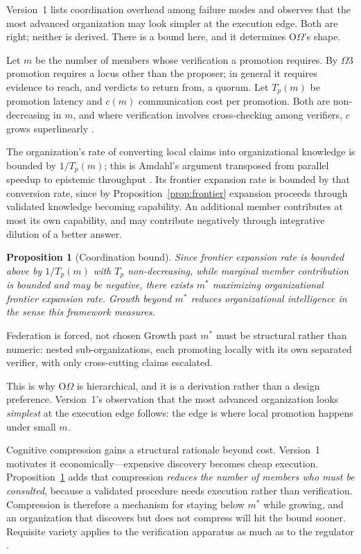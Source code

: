 \documentclass[11pt]{article}
\newtheorem{proposition}{Proposition}
\newcommand{\OOm}{\ensuremath{\mathrm{O}\Omega}}
\newcommand{\Tp}{\ensuremath{T_p}}
\begin{document}
Version~1 lists coordination overhead among failure modes and observes that the most advanced organization may look simpler at the execution edge. Both are right; neither is derived. There is a bound here, and it determines \OOm{}'s shape.

Let $m$ be the number of members whose verification a promotion requires. By $\Omega$3 promotion requires a locus other than the proposer; in general it requires evidence to reach, and verdicts to return from, a quorum. Let $\Tp(m)$ be promotion latency and $c(m)$ communication cost per promotion. Both are non-decreasing in $m$, and where verification involves cross-checking among verifiers, $c$ grows superlinearly \citep{brooks1975mythical}.

The organization's rate of converting local claims into organizational knowledge is bounded by $1/\Tp(m)$; this is Amdahl's argument transposed from parallel speedup to epistemic throughput \citep{amdahl1967validity}. Its frontier expansion rate is bounded by that conversion rate, since by Proposition~\ref{prop:frontier} expansion proceeds through validated knowledge becoming capability. An additional member contributes at most its own capability, and may contribute negatively through integrative dilution of a better answer.

\begin{proposition}[Coordination bound]\label{prop:coord}
Since frontier expansion rate is bounded above by $1/\Tp(m)$ with $\Tp$ non-decreasing, while marginal member contribution is bounded and may be negative, there exists $m^*$ maximizing organizational frontier expansion rate. Growth beyond $m^*$ reduces organizational intelligence in the sense this framework measures.
\end{proposition}

\begin{claimbox}{Federation is forced, not chosen}
Growth past $m^*$ must be structural rather than numeric: nested sub-organizations, each promoting locally with its own separated verifier, with only cross-cutting claims escalated.
\end{claimbox}

This is why \OOm{} is hierarchical, and it is a derivation rather than a design preference. Version~1's observation that the most advanced organization looks \emph{simplest} at the execution edge follows: the edge is where local promotion happens under small $m$.

Cognitive compression gains a structural rationale beyond cost. Version~1 motivates it economically---expensive discovery becomes cheap execution. Proposition~\ref{prop:coord} adds that compression \emph{reduces the number of members who must be consulted}, because a validated procedure needs execution rather than verification. Compression is therefore a mechanism for staying below $m^*$ while growing, and an organization that discovers but does not compress will hit the bound sooner. Requisite variety applies to the verification apparatus as much as to the regulator \citep{ashby1956introduction}.
\end{document}
